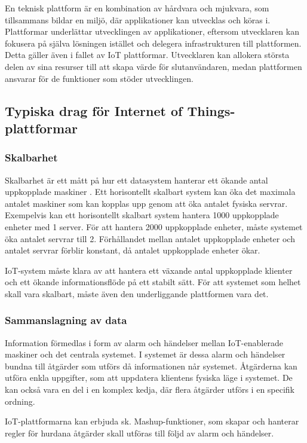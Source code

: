En teknisk plattform är en kombination av hårdvara och mjukvara, som
tillsammans bildar en miljö, där applikationer kan utvecklas och köras i.
Plattformar underlättar utvecklingen av applikationer, eftersom utvecklaren
kan fokusera på själva lösningen istället och delegera infrastrukturen
till plattformen.
Detta gäller även i fallet av IoT plattformar. Utvecklaren kan allokera
största delen av sina resurser till att skapa värde för slutanvändaren,
medan plattformen ansvarar för de funktioner som stöder utvecklingen.

\subsection{Typiska drag för Internet of Things-plattformar}

\subsubsection{Skalbarhet}
Skalbarhet är ett mått på hur ett datasystem hanterar ett ökande antal 
uppkopplade maskiner \cite{scalability_def}. Ett horisontellt skalbart system
kan öka det maximala antalet maskiner som kan kopplas upp genom att öka
antalet fysiska servrar.
Exempelvis kan ett horisontellt skalbart system hantera 1000 uppkopplade
enheter med 1 server. För att hantera 2000 uppkopplade enheter, måste systemet
öka antalet servrar till 2. Förhållandet mellan antalet uppkopplade enheter
och antalet servrar förblir konstant, då antalet uppkopplade enheter ökar.

IoT-system måste klara av att hantera ett växande antal uppkopplade klienter
och ett ökande informationsflöde på ett stabilt sätt. För att systemet som
helhet skall vara skalbart, måste även den underliggande plattformen vara det.

\subsubsection{Sammanslagning av data}
Information förmedlas i form av alarm och händelser mellan IoT-enablerade
maskiner och det centrala systemet. I systemet är dessa alarm och händelser
bundna till åtgärder som utförs då informationen når systemet. Åtgärderna
kan utföra enkla uppgifter, som att uppdatera klientens fysiska läge
i systemet. De kan också vara en del i en komplex kedja, där flera åtgärder
utförs i en specifik ordning.

IoT-plattformarna kan erbjuda sk. Mashup-funktioner, som skapar och hanterar
regler för hurdana åtgärder skall utföras till följd av alarm och händelser.
\cite{mashup_def} 

